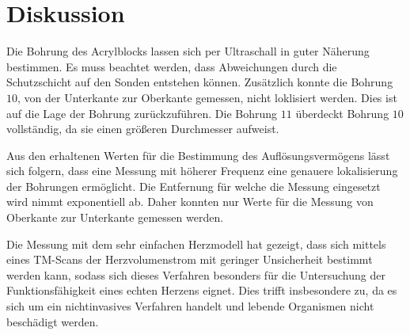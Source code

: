 \section{Diskussion}
\label{sec:Diskussion}
Die Bohrung des Acrylblocks lassen sich per Ultraschall in guter Näherung bestimmen.
Es muss beachtet werden, dass Abweichungen durch die Schutzschicht auf den Sonden entstehen können.
Zusätzlich konnte die Bohrung $10$, von der Unterkante zur Oberkante gemessen, nicht loklisiert werden.
Dies ist auf die Lage der Bohrung zurückzuführen.
Die Bohrung $11$ überdeckt Bohrung $10$ vollständig, da sie einen größeren Durchmesser aufweist. 


Aus den erhaltenen Werten für die Bestimmung des Auflösungsvermögens lässt sich folgern, 
dass eine Messung mit höherer Frequenz eine genauere lokalisierung der Bohrungen ermöglicht.
Die Entfernung für welche die Messung eingesetzt wird nimmt exponentiell ab.
Daher konnten nur Werte für die Messung von Oberkante zur Unterkante gemessen werden.


Die Messung mit dem sehr einfachen Herzmodell hat gezeigt, dass sich mittels eines TM-Scans der Herzvolumenstrom mit geringer Unsicherheit 
bestimmt werden kann, sodass sich dieses Verfahren besonders für die Untersuchung der Funktionsfähigkeit eines echten Herzens eignet.
Dies trifft insbesondere zu, da es sich um ein nichtinvasives Verfahren handelt und lebende Organismen nicht beschädigt werden.
